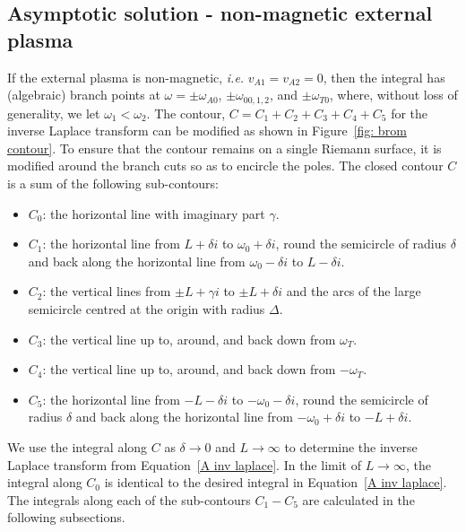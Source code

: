 \documentclass[12pt]{../style-files/ociamthesis}
\begin{document}
\subsection{Asymptotic solution - non-magnetic external plasma}
If the external plasma is non-magnetic, \textit{i.e.} $v_{A1} = v_{A2} = 0$, then the integral has (algebraic) branch points at $\omega = \pm \omega_{A0}$, $\pm \omega_{00,1,2}$, and $\pm \omega_{T0}$, where, without loss of generality, we let $\omega_1 < \omega_2$. The contour, $C = C_1 + C_2 + C_3 + C_4 + C_5$ for the inverse Laplace transform can be modified as shown in Figure~\ref{fig: brom contour}. To ensure that the contour remains on a single Riemann surface, it is modified around the branch cuts so as to encircle the poles. The closed contour $C$ is a sum of the following sub-contours:
\begin{itemize}
	\item $C_0$: the horizontal line with imaginary part $\gamma$.
	\item $C_1$: the horizontal line from $L + \delta i$ to $\omega_0 + \delta i$, round the semicircle of radius $\delta$ and back along the horizontal line from $\omega_0 - \delta i$ to $L - \delta i$.
	\item $C_2$: the vertical lines from $\pm L + \gamma i$ to $\pm L + \delta i$ and the arcs of the large semicircle centred at the origin with radius $\Delta$.
	\item $C_3$: the vertical line up to, around, and back down from $\omega_T$.
	\item $C_4$: the vertical line up to, around, and back down from $-\omega_T$.
	\item $C_5$: the horizontal line from $-L - \delta i$ to $-\omega_0 - \delta i$, round the semicircle of radius $\delta$ and back along the horizontal line from $-\omega_0 + \delta i$ to $-L + \delta i$.
\end{itemize}
We use the integral along $C$ as $\delta \to 0$ and $L \to \infty$ to determine the inverse Laplace transform from Equation~\eqref{A inv laplace}. In the limit of $L \to \infty$, the integral along $C_0$ is identical to the desired integral in Equation~\eqref{A inv laplace}. The integrals along each of the sub-contours $C_1 - C_5$ are calculated in the following subsections.
\end{document}
